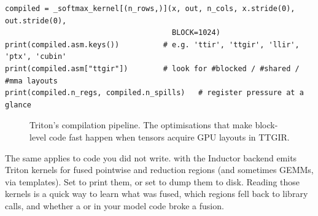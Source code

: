 \begin{lstlisting}[caption={Dumping the intermediate representations of a compiled kernel (GPU).},
label={lst:triton:asm}]
compiled = _softmax_kernel[(n_rows,)](x, out, n_cols, x.stride(0), out.stride(0),
                                      BLOCK=1024)
print(compiled.asm.keys())          # e.g. 'ttir', 'ttgir', 'llir', 'ptx', 'cubin'
print(compiled.asm["ttgir"])        # look for #blocked / #shared / #mma layouts
print(compiled.n_regs, compiled.n_spills)   # register pressure at a glance
\end{lstlisting}

\begin{figure}[t]
\centering
{}
\caption{Triton's compilation pipeline. The optimisations that make block-level code fast
happen when tensors acquire GPU layouts in TTGIR.}
\label{fig:triton:compiler}
\end{figure}

The same applies to code you did not write.  with the Inductor
backend emits Triton kernels for fused pointwise and reduction regions (and sometimes
GEMMs, via templates). Set  to print them, or set
 to dump them to disk. Reading those kernels is a quick way
to learn what was fused, which regions fell back to library calls, and whether a
 or  in your model code broke a fusion.

